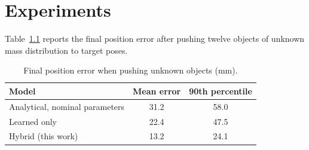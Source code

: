 \chapter{Experiments}
\label{ch:results}

Table~\ref{tab:push} reports the final position error after pushing twelve objects of unknown
mass distribution to target poses.

\begin{table}[htbp]
  \centering
  \caption{Final position error when pushing unknown objects (mm).}
  \label{tab:push}
  \begin{tabular}{lcc}
    \toprule
    Model & Mean error & 90th percentile \\
    \midrule
    Analytical, nominal parameters & 31.2 & 58.0 \\
    Learned only                   & 22.4 & 47.5 \\
    Hybrid (this work)             & 13.2 & 24.1 \\
    \bottomrule
  \end{tabular}
\end{table}
